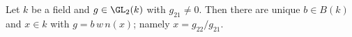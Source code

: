 Let $k$ be a field and $g\in\GL_2(k)$ with $g_{21}\neq0$. Then there are unique $b\in B(k)$ and $x\in k$ with
$g=b\,w\,n(x)$; namely $x=g_{22}/g_{21}$.
